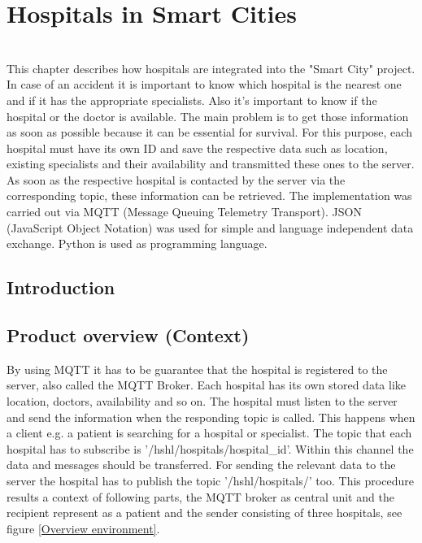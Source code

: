 \chapter{Hospitals in Smart Cities}
\label{abstract} 

\abstract
\\This chapter describes how hospitals are integrated into the "Smart City" project.
In case of an accident it is important to know which hospital is the nearest one and if it has the appropriate specialists. Also it’s important to know if the hospital or the doctor is available.
The main problem is to get those information as soon as possible because it can be essential for survival. For this purpose, each hospital must have its own ID and save the respective data such as location, existing specialists and their availability and transmitted these ones to the server. As soon as the respective hospital is contacted by the server via the corresponding topic, these information can be retrieved.
The implementation was carried out via MQTT (Message Queuing Telemetry Transport). JSON (JavaScript Object Notation) was used for simple and language independent data exchange. Python is used as programming language.


\section{Introduction}
\label{sec:1}


\section{Product overview (Context)}
\label{Hospital_Product overview}


By using MQTT it has to be guarantee that the hospital is registered to the server, also called the MQTT Broker. Each hospital has its own stored data like location, doctors, availability and so on. The hospital must listen to the server and send the information when the responding topic is called. This happens when a client e.g. a patient is searching for a hospital or specialist. The topic that each hospital has to subscribe is '/hshl/hospitals/hospital_id'. Within this channel the data and messages should be transferred. For sending the relevant data to the server the hospital has to publish the topic '/hshl/hospitals/' too. This procedure results a context of following parts, the MQTT broker as central unit and the recipient represent as a patient and the sender consisting of three hospitals, see figure \ref{Overview environment}. 

